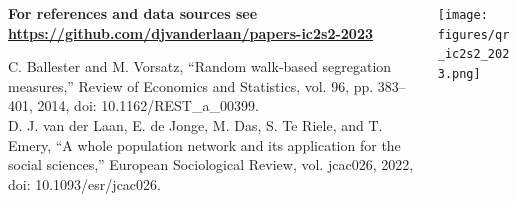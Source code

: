 \documentclass[aspectratio=169]{beamer}
\begin{document}
\begin{frame}

  \begin{columns}
    \begin{column}{0.67\textwidth}
      {\bf For references and data sources see
      \url{https://github.com/djvanderlaan/papers-ic2s2-2023}\\[2em]
      }

      
  \footnotesize
      C. Ballester and M. Vorsatz, “Random walk-based segregation measures,” Review of Economics and Statistics, vol. 96, pp. 383–401, 2014, doi: 10.1162/REST\_a\_00399.\\[0.5em]
      D. J. van der Laan, E. de Jonge, M. Das, S. Te Riele, and T. Emery, “A whole population network and its application for the social sciences,” European Sociological Review, vol. jcac026, 2022, doi: 10.1093/esr/jcac026.

    \end{column}

    \begin{column}{0.30\textwidth}
      \texttt{[image: figures/qr\_ic2s2\_2023.png]}
    \end{column}
  \end{columns}

\end{frame}
\end{document}
